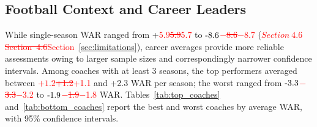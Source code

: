 \documentclass[USenglish]{article}
\newcommand{\rev}[1]{\textcolor{red}{#1}}
\newcommand{\del}[1]{\textcolor{red}{\ifmmode\mbox{\sout{\ensuremath{#1}}}\else\sout{#1}\fi}}
\theoremstyle{dgthm}
\theoremstyle{dgdef}
\begin{document}
\subsection{Football Context and Career Leaders}

While single-season WAR ranged from +\del{5.9}\rev{5.7} to \del{$-$8.6}\rev{$-$8.7} (\del{Section~4.6}\rev{Section~\ref{sec:limitations}}), career averages provide more reliable assessments owing to larger sample sizes and correspondingly narrower confidence intervals. Among coaches with at least 3 seasons, the top performers averaged between \del{+1.2}\rev{+1.1} and +2.3 WAR per season; the worst ranged from \del{$-$3.3}\rev{$-$3.2} to \del{$-$1.9}\rev{$-$1.8} WAR. Tables~\ref{tab:top_coaches} and~\ref{tab:bottom_coaches} report the best and worst coaches by average WAR, with 95\% confidence intervals.
\end{document}
